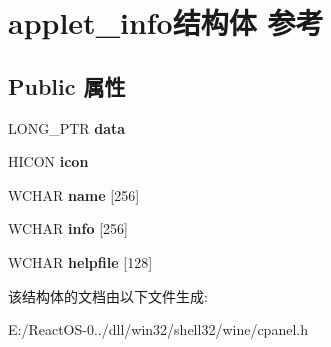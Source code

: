 \hypertarget{structapplet__info}{}\section{applet\+\_\+info结构体 参考}
\label{structapplet__info}
\subsection*{Public 属性}
\begin{DoxyCompactItemize}
\item 
\mbox{\label{structapplet__info_a3efbb30b323d4fdb66bd698bd98d8259}} 
L\+O\+N\+G\+\_\+\+P\+TR {\bfseries data}
\item 
\mbox{\label{structapplet__info_a312bb5669feb7fe80a30dcf9208b7fa6}} 
H\+I\+C\+ON {\bfseries icon}
\item 
\mbox{\label{structapplet__info_ac6fb27097bd5b0d2381f7bd72caef4bd}} 
W\+C\+H\+AR {\bfseries name} \mbox{[}256\mbox{]}
\item 
\mbox{\label{structapplet__info_a34049f084b33bb82260bffb7ddd474b7}} 
W\+C\+H\+AR {\bfseries info} \mbox{[}256\mbox{]}
\item 
\mbox{\label{structapplet__info_a71cb8850be46714390d61dabf3781bd0}} 
W\+C\+H\+AR {\bfseries helpfile} \mbox{[}128\mbox{]}
\end{DoxyCompactItemize}


该结构体的文档由以下文件生成\+:\begin{DoxyCompactItemize}
\item 
E\+:/\+React\+O\+S-\/0../dll/win32/shell32/wine/cpanel.\+h\end{DoxyCompactItemize}
